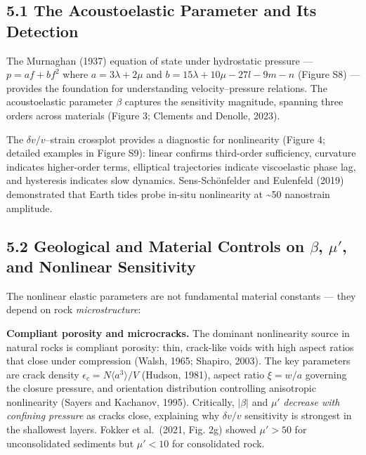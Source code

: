 \documentclass[draft]{agujournal2019}
\begin{document}
\subsection{5.1 The Acoustoelastic Parameter and Its
Detection}\label{the-acoustoelastic-parameter-and-its-detection}

The Murnaghan (1937) equation of state under hydrostatic pressure ---
\(p = af + bf^2\) where \(a = 3\lambda + 2\mu\) and
\(b = 15\lambda + 10\mu - 27l - 9m - n\) (Figure S8) --- provides the
foundation for understanding velocity--pressure relations. The
acoustoelastic parameter \(\beta\) captures the sensitivity magnitude,
spanning three orders across materials (Figure 3; Clements and Denolle,
2023).

The \(\delta v/v\)--strain crossplot provides a diagnostic for
nonlinearity (Figure 4; detailed examples in Figure S9): linear confirms
third-order sufficiency, curvature indicates higher-order terms,
elliptical trajectories indicate viscoelastic phase lag, and hysteresis
indicates slow dynamics. Sens-Schönfelder and Eulenfeld (2019)
demonstrated that Earth tides probe in-situ nonlinearity at
\textasciitilde{}50 nanostrain amplitude.

\subsection{\texorpdfstring{5.2 Geological and Material Controls on
\(\beta\), \(\mu'\), and Nonlinear
Sensitivity}{5.2 Geological and Material Controls on \textbackslash beta, \textbackslash mu\textquotesingle, and Nonlinear Sensitivity}}\label{geological-and-material-controls-on-beta-mu-and-nonlinear-sensitivity}

The nonlinear elastic parameters are not fundamental material constants
--- they depend on rock \emph{microstructure}:

\textbf{Compliant porosity and microcracks.} The dominant nonlinearity
source in natural rocks is compliant porosity: thin, crack-like voids
with high aspect ratios that close under compression (Walsh, 1965;
Shapiro, 2003). The key parameters are crack density
\(\epsilon_c = N\langle a^3\rangle/V\) (Hudson, 1981), aspect ratio
\(\xi = w/a\) governing the closure pressure, and orientation
distribution controlling anisotropic nonlinearity (Sayers and Kachanov,
1995). Critically, \(|\beta|\) and \(\mu'\) \emph{decrease with
confining pressure} as cracks close, explaining why \(\delta v/v\)
sensitivity is strongest in the shallowest layers. Fokker et al.~(2021,
Fig. 2g) showed \(\mu' > 50\) for unconsolidated sediments but
\(\mu' < 10\) for consolidated rock.
\end{document}
